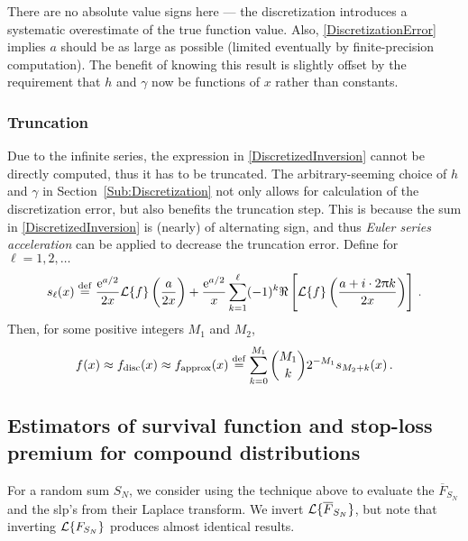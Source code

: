 There are no absolute value signs here --- the discretization introduces a systematic overestimate of the true function value.
Also, \eqref{DiscretizationError} implies $a$ should be as large as possible (limited eventually by finite-precision computation).
The benefit of knowing this result is slightly offset by the requirement that $h$ and $\gamma$ now be functions of $x$ rather than constants.

\subsubsection{Truncation}

Due to the infinite series, the expression in \eqref{DiscretizedInversion} cannot be directly computed, thus it has to be truncated.
The arbitrary-seeming choice of $h$ and $\gamma$ in Section~\ref{Sub:Discretization} not only allows for calculation of the discretization error, but also benefits the truncation step. This is because the sum in \eqref{DiscretizedInversion} is (nearly) of alternating sign, and thus \emph{Euler series acceleration} can be applied to decrease the truncation error. Define for $\ell=1,2,\dots$
\begin{equation*} \label{TruncatedInversion}
s_\ell(x) \overset{\mathrm{def}}{=} \frac{\mathrm{e}^{a/2}}{2x}\mathcal{L}\{f\} \left(\frac{a}{2 x}\right) + \frac{\mathrm{e}^{a/2}}{x} \sum_{k=1}^\ell (-1)^{k} \Re\left[\mathcal{L}\{f\}\left(\frac{a+ i \cdot 2\uppi k}{2 x}\right)\right] \,.
\end{equation*}
Then, for some positive integers $M_1$ and $M_2$,
\begin{equation}\label{eq:FinalApproxLaplaceInversion}
f(x) \approx f_{\text{disc}}(x) \approx f_{\text{approx}}(x) \overset{\mathrm{def}}{=} \sum_{k=0}^{M_1} \binom{M_1}{k} 2^{-M_1} s_{M_2+k}(x) \,.
\end{equation}

\subsection{Estimators of survival function and stop-loss premium for compound distributions}

For a random sum  $S_N$, we consider using the technique above to evaluate the \svf $\overline{F}_{S_N}$ and the slp's from their Laplace transform.
We invert $\mathcal{L}\{\overline{F}_{S_N}\}$, but note that inverting $\mathcal{L}\{F_{S_N}\}$ produces almost identical results.

